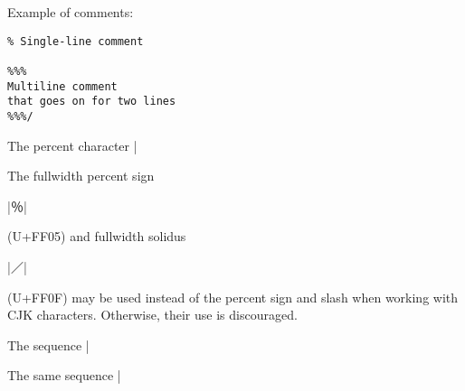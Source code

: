 \documentclass[11pt]{article}
\newcommand{\bespon}{BespON}
\begin{document}
Example of comments:
\begin{Verbatim}
% Single-line comment

%%% 
Multiline comment
that goes on for two lines
%%%/
\end{Verbatim}

The percent character |%

The fullwidth percent sign \begin{CJK*}{UTF8}{gkai}|％|\end{CJK*} (U+FF05) and fullwidth solidus \begin{CJK*}{UTF8}{gkai}|／|\end{CJK*} (U+FF0F) may be used instead of the percent sign and slash when working with CJK characters.  Otherwise, their use is discouraged.

The sequence |%

The same sequence |%
\end{document}
